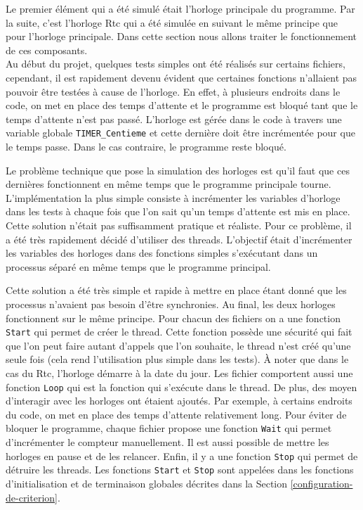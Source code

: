 \documentclass[a4paper]{article}
\begin{document}
Le premier élément qui a été simulé était l'horloge principale du programme. Par
la suite, c'est l'horloge Rtc qui a été simulée en suivant le même principe que
pour l'horloge principale. Dans cette section nous allons traiter le
fonctionnement de ces composants.\\

Au début du projet, quelques tests simples ont été réalisés sur certains
fichiers, cependant, il est rapidement devenu évident que certaines fonctions
n'allaient pas pouvoir être testées à cause de l'horloge. En effet, à plusieurs
endroits dans le code, on met en place des temps d'attente et le programme est
bloqué tant que le temps d'attente n'est pas passé. L'horloge est gérée dans le
code à travers une variable globale \verb|TIMER_Centieme| et cette dernière
doit être incrémentée pour que le temps passe. Dans le cas contraire, le
programme reste bloqué.

Le problème technique que pose la simulation des horloges est qu'il faut que ces
dernières fonctionnent en même temps que le programme principale tourne.
L'implémentation la plus simple consiste à incrémenter les variables d'horloge
dans les tests à chaque fois que l'on sait qu'un temps d'attente est mis en
place. Cette solution n'était pas suffisamment pratique et réaliste. Pour ce
problème, il a été très rapidement décidé d'utiliser des threads. L'objectif
était d'incrémenter les variables des horloges dans des fonctions simples
s'exécutant dans un processus séparé en même temps que le programme principal.

Cette solution a été très simple et rapide à mettre en place étant donné que les
processus n'avaient pas besoin d'être synchronies. Au final, les deux horloges
fonctionnent sur le même principe. Pour chacun des fichiers on a une fonction
\verb|Start| qui permet de créer le thread. Cette fonction possède une
sécurité qui fait que l'on peut faire autant d'appels que l'on souhaite, le
thread n'est créé qu'une seule fois (cela rend l'utilisation plus simple dans
les tests). À noter que dans le cas du Rtc, l'horloge démarre à la date du jour.
Les fichier comportent aussi une fonction \verb|Loop| qui est la fonction
qui s'exécute dans le thread. De plus, des moyen d'interagir avec les horloges
ont étaient ajoutés. Par exemple, à certains endroits du code, on met en place
des temps d'attente relativement long. Pour éviter de bloquer le programme,
chaque fichier propose une fonction \verb|Wait| qui permet d'incrémenter le
compteur manuellement. Il est aussi possible de mettre les horloges en pause et
de les relancer. Enfin, il y a une fonction \verb|Stop| qui permet de
détruire les threads. Les fonctions \verb|Start| et \verb|Stop| sont
appelées dans les fonctions d'initialisation et de terminaison globales décrites
dans la Section \ref{configuration-de-criterion}.\\
\end{document}
